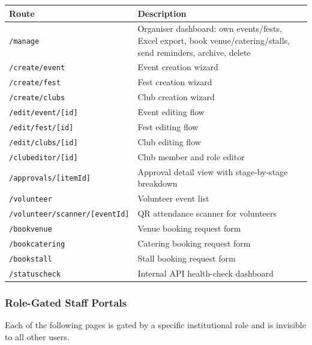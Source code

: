 \documentclass[12pt,a4paper]{article}
\begin{document}
\begin{tabularx}{\textwidth}{L{5cm} X}
\toprule
{}
\textbf{Route} & \textbf{Description} \\
\midrule
\texttt{/manage} & Organiser dashboard: own events/fests, Excel export, book venue/catering/stalls, send reminders, archive, delete \\
\texttt{/create/event} & Event creation wizard \\
\texttt{/create/fest} & Fest creation wizard \\
\texttt{/create/clubs} & Club creation wizard \\
\texttt{/edit/event/[id]} & Event editing flow \\
\texttt{/edit/fest/[id]} & Fest editing flow \\
\texttt{/edit/clubs/[id]} & Club editing flow \\
\texttt{/clubeditor/[id]} & Club member and role editor \\
\texttt{/approvals/[itemId]} & Approval detail view with stage-by-stage breakdown \\
\texttt{/volunteer} & Volunteer event list \\
\texttt{/volunteer/scanner/[eventId]} & QR attendance scanner for volunteers \\
\texttt{/bookvenue} & Venue booking request form \\
\texttt{/bookcatering} & Catering booking request form \\
\texttt{/bookstall} & Stall booking request form \\
\texttt{/statuscheck} & Internal API health-check dashboard \\
\bottomrule
\end{tabularx}

\subsubsection{Role-Gated Staff Portals}

Each of the following pages is gated by a specific institutional role and is invisible to all other users.
\end{document}
